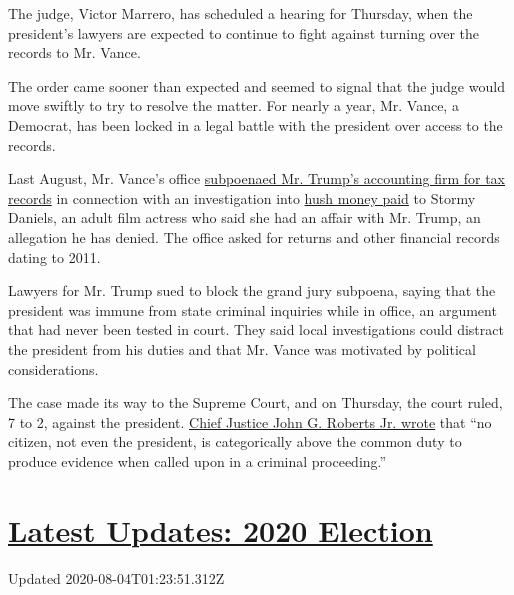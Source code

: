 The judge, Victor Marrero, has scheduled a hearing for Thursday, when
the president's lawyers are expected to continue to fight against
turning over the records to Mr. Vance.

The order came sooner than expected and seemed to signal that the judge
would move swiftly to try to resolve the matter. For nearly a year, Mr.
Vance, a Democrat, has been locked in a legal battle with the president
over access to the records.

Last August, Mr. Vance's office
\href{https://www.nytimes.com/2020/08/03/nyregion/donald-trump-taxes-cyrus-vance.html}{subpoenaed
Mr. Trump's accounting firm for tax records} in connection with an
investigation into
\href{https://www.nytimes.com/2019/08/01/nyregion/trump-cohen-stormy-daniels-vance.html}{hush
money paid} to Stormy Daniels, an adult film actress who said she had an
affair with Mr. Trump, an allegation he has denied. The office asked for
returns and other financial records dating to 2011.

Lawyers for Mr. Trump sued to block the grand jury subpoena, saying that
the president was immune from state criminal inquiries while in office,
an argument that had never been tested in court. They said local
investigations could distract the president from his duties and that Mr.
Vance was motivated by political considerations.

The case made its way to the Supreme Court, and on Thursday, the court
ruled, 7 to 2, against the president.
\href{https://www.supremecourt.gov/opinions/19pdf/19-635_o7jq.pdf}{Chief
Justice John G. Roberts Jr. wrote} that ``no citizen, not even the
president, is categorically above the common duty to produce evidence
when called upon in a criminal proceeding.''

\hypertarget{latest-updates-2020-election}{%
\section{\texorpdfstring{\href{https://www.nytimes.com/2020/08/03/us/elections/biden-vs-trump.html?action=click\&pgtype=Article\&state=default\&region=MAIN_CONTENT_1\&context=storylines_live_updates}{Latest
Updates: 2020
Election}}{Latest Updates: 2020 Election}}\label{latest-updates-2020-election}}

Updated 2020-08-04T01:23:51.312Z

